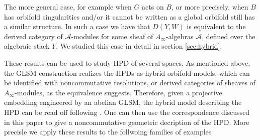\documentclass[a4paper,11pt]{article}
\numberwithin{equation}{section}
\begin{document}
The more general case, for example when $G$ acts on $B$, or more precisely, 
when $B$ has orbifold singularities and/or it cannot be written as a global 
orbifold still has a similar structure. In such a case we have that $D(Y,W)$ is 
equivalent to the derived category of $\mathcal{A}$-modules for some 
sheaf of $A_{\infty}$-algebras $\mathcal{A}$, defined over the algebraic stack 
$Y$. We 
studied this case in detail in section \ref{sec:hybrid}.

These results can be used to study HPD of several spaces. As 
mentioned above, the GLSM construction realizes the HPDs as hybrid 
orbifold models, which can be identified with noncommutative 
resolutions, or derived categories of sheaves of $A_\infty$-modules, as the 
equivalence suggests. Therefore, given a projective embedding engineered by an 
abelian GLSM, the hybrid model describing the HPD can be read off following 
\cite{Chen:2020iyo}. One can then use the correspondence discussed in this paper 
to give a noncommutative geometric decription of the HPD. More precisle we 
apply these results to the follwoing families of examples
\end{document}
